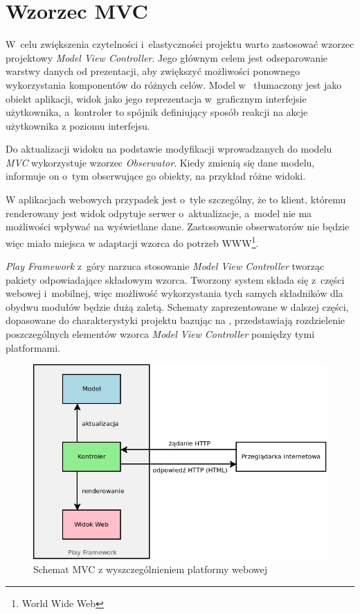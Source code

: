 \documentclass[11pt]{aghdpl}
\begin{document}
\section{Wzorzec MVC}
\label{sec:wzorzecMVC}

W~celu zwiększenia czytelności i~elastyczności projektu warto zastosować wzorzec projektowy \emph{Model View Controller}. Jego głównym celem jest odseparowanie warstwy danych od prezentacji, aby zwiększyć możliwości ponownego wykorzystania komponentów do różnych celów. Model w~\cite{GoF} tłumaczony jest jako obiekt aplikacji, widok jako jego reprezentacja w~graficznym interfejsie użytkownika, a~kontroler to spójnik definiujący sposób reakcji na akcje użytkownika z poziomu interfejsu.

Do aktualizacji widoku na podstawie modyfikacji wprowadzanych do modelu \emph{MVC} wykorzystuje wzorzec \emph{Obserwator}. Kiedy zmienią się dane modelu, informuje on o~tym obserwujące go obiekty, na przykład różne widoki.

W aplikacjach webowych przypadek jest o~tyle szczególny, że to klient, któremu renderowany jest widok odpytuje serwer o~aktualizacje, a~model nie ma możliwości wpływać na wyświetlane dane. Zastosowanie obserwatorów nie będzie więc miało miejsca w adaptacji wzorca do potrzeb WWW\footnote{World Wide Web}.

\emph{Play Framework} z~góry narzuca stosowanie \emph{Model View Controller} tworząc pakiety odpowiadające składowym wzorca. Tworzony system składa się z~części webowej i~mobilnej, więc możliwość wykorzystania tych samych składników dla obydwu modułów będzie dużą zaletą. Schematy zaprezentowane w dalszej części, dopasowane do charakterystyki projektu bazując na \cite{PfMC}, przedstawiają rozdzielenie poszczególnych elementów wzorca \emph{Model View Controller} pomiędzy tymi platformami.

\begin{figure}[h!]
	\centering
	\includegraphics[width=\linewidth * 4/5]{MVC-WEB}
	\caption{Schemat MVC z wyszczególnieniem platformy webowej}
	\label{fig:mvc-web}
\end{figure}
\end{document}
